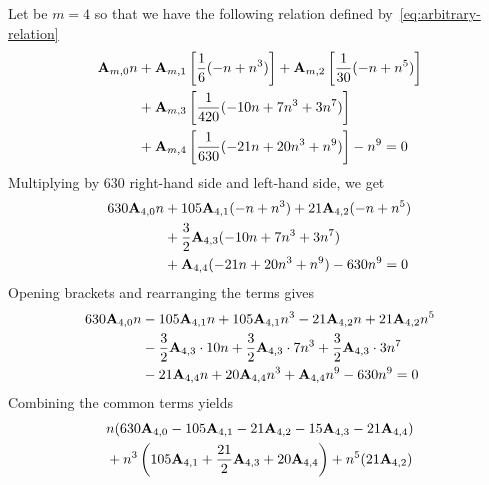 \begin{example}
    Let be $m=4$ so that we have the following relation defined by~\eqref{eq:arbitrary-relation}
    \begin{equation*}
        \begin{split}
            {\mathbf{A}} \sb{m,0} n
            &+ {\mathbf{A}} \sb{m,1} \left[ \frac{1}{6} (-n + n^3) \right]
            + {\mathbf{A}} \sb{m,2} \left[ \frac{1}{30} (-n + n^5) \right] \\
            &+ {\mathbf{A}} \sb{m,3} \left[ \frac{1}{420} (-10 n + 7 n^3 + 3 n^7) \right] \\
            &+ {\mathbf{A}} \sb{m,4} \left[ \frac{1}{630} (-21 n + 20 n^3 + n^9) \right] - n^9 = 0
        \end{split}
    \end{equation*}
    Multiplying by $630$ right-hand side and left-hand side, we get
    \begin{equation*}
        \begin{split}
            630 {\mathbf{A}} \sb{4,0} n
            &+ 105 {\mathbf{A}} \sb{4,1} (-n + n^3) + 21 {\mathbf{A}} \sb{4,2} (-n + n^5) \\
            &+ \frac{3}{2} {\mathbf{A}} \sb{4,3} (-10 n + 7 n^3 + 3 n^7) \\
            &+ {\mathbf{A}} \sb{4,4} (-21 n + 20 n^3 + n^9) - 630 n^9 = 0
        \end{split}
    \end{equation*}
    Opening brackets and rearranging the terms gives
    \begin{equation*}
        \begin{split}
            630 {\mathbf{A}} \sb{4,0} n
            &- 105 {\mathbf{A}} \sb{4,1} n + 105 {\mathbf{A}} \sb{4,1} n ^3 - 21 {\mathbf{A}} \sb{4,2} n + 21 {\mathbf{A}} \sb{4,2} n^5 \\
            &- \frac{3}{2} {\mathbf{A}} \sb{4,3} \cdot 10n + \frac{3}{2} {\mathbf{A}} \sb{4,3} \cdot 7n^3 + \frac{3}{2} {\mathbf{A}} \sb{4,3} \cdot 3n^7 \\
            &-21 {\mathbf{A}} \sb{4,4} n + 20 {\mathbf{A}} \sb{4,4} n^3 + {\mathbf{A}} \sb{4,4} n ^9 - 630 n^9 = 0
        \end{split}
    \end{equation*}
    Combining the common terms yields
    \begin{equation*}
        \begin{split}
            &n (630 \coeffA{4}{0} - 105 \coeffA{4}{1} - 21 \coeffA{4}{2} - 15 \coeffA{4}{3} - 21 \coeffA{4}{4})  \\
            &+ n^3 \left( 105 \coeffA{4}{1} + \frac{21}{2} \coeffA{4}{3} + 20 \coeffA{4}{4} \right) + n^5 (21 \coeffA{4}{2}) \\

\end{split}
\end{equation*}
\end{example}

